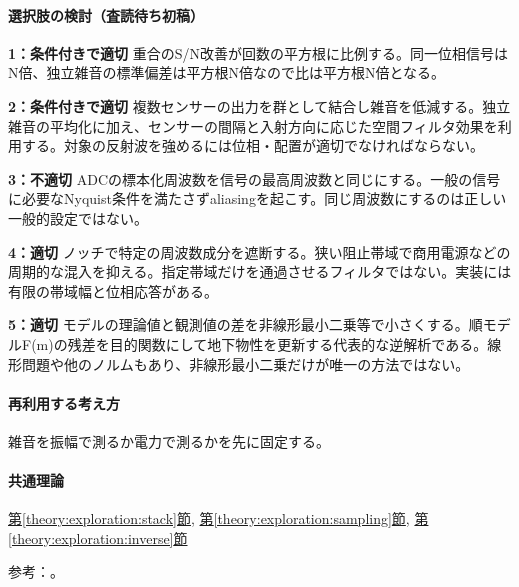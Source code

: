 \paragraph{選択肢の検討（査読待ち初稿）}\mbox{}\par

\noindent\textbf{1：条件付きで適切} 重合のS/N改善が回数の平方根に比例する。同一位相信号はN倍、独立雑音の標準偏差は平方根N倍なので比は平方根N倍となる。\par

\noindent\textbf{2：条件付きで適切} 複数センサーの出力を群として結合し雑音を低減する。独立雑音の平均化に加え、センサーの間隔と入射方向に応じた空間フィルタ効果を利用する。対象の反射波を強めるには位相・配置が適切でなければならない。\par

\noindent\textbf{3：不適切} ADCの標本化周波数を信号の最高周波数と同じにする。一般の信号に必要なNyquist条件を満たさずaliasingを起こす。同じ周波数にするのは正しい一般的設定ではない。\par

\noindent\textbf{4：適切} ノッチで特定の周波数成分を遮断する。狭い阻止帯域で商用電源などの周期的な混入を抑える。指定帯域だけを通過させるフィルタではない。実装には有限の帯域幅と位相応答がある。\par

\noindent\textbf{5：適切} モデルの理論値と観測値の差を非線形最小二乗等で小さくする。順モデルF(m)の残差を目的関数にして地下物性を更新する代表的な逆解析である。線形問題や他のノルムもあり、非線形最小二乗だけが唯一の方法ではない。\par

\paragraph{再利用する考え方} 雑音を振幅で測るか電力で測るかを先に固定する。

\paragraph{共通理論} \hyperref[theory:exploration:stack]{第\ref*{theory:exploration:stack}節}, \hyperref[theory:exploration:sampling]{第\ref*{theory:exploration:sampling}節}, \hyperref[theory:exploration:inverse]{第\ref*{theory:exploration:inverse}節}

\par 参考：\cite{mit_signals2010,mit_moving2012,scipy_notch,scipy_fft,usgs_processing2000,pygimli_inversion}。

